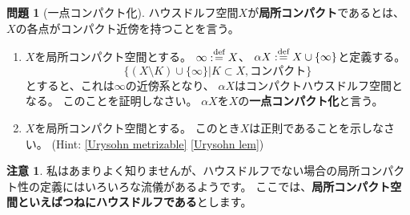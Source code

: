 \documentclass[uplatex]{jsarticle}
\theoremstyle{definition}
\newtheorem{prob}[prob]{問題}
\newtheorem*{rem*}{注意}
\newcommand{\dfn}{:\overset{\mbox{{\scriptsize def}}}{=}}
\begin{document}
\begin{prob}[一点コンパクト化]
  ハウスドルフ空間\(X\)が\textbf{局所コンパクト}であるとは、
  \(X\)の各点がコンパクト近傍を持つことを言う。
  \begin{enumerate}
    \item
    \(X\)を局所コンパクト空間とする。
    \(\infty \dfn X\)、
    \(\alpha X\dfn X\cup \{\infty\}\)と定義する。
    \[
    \{ (X\setminus K)\cup \{\infty\} | K\subset X,\text{コンパクト}\}
    \]
    とすると、これは\(\infty\)の近傍系となり、
    \(\alpha X\)はコンパクトハウスドルフ空間となる。
    このことを証明しなさい。
    \(\alpha X\)を\(X\)の\textbf{一点コンパクト化}と言う。
    \item
    \(X\)を局所コンパクト空間とする。
    このとき\(X\)は正則であることを示しなさい。
    (Hint: \autoref{Urysohn metrizable} \ref{Urysohn lem})
  \end{enumerate}
\end{prob}

\begin{rem*}
  私はあまりよく知りませんが、ハウスドルフでない場合の局所コンパクト性の定義にはいろいろな流儀があるようです。
  ここでは、\textbf{局所コンパクト空間といえばつねにハウスドルフである}とします。
\end{rem*}
\end{document}
